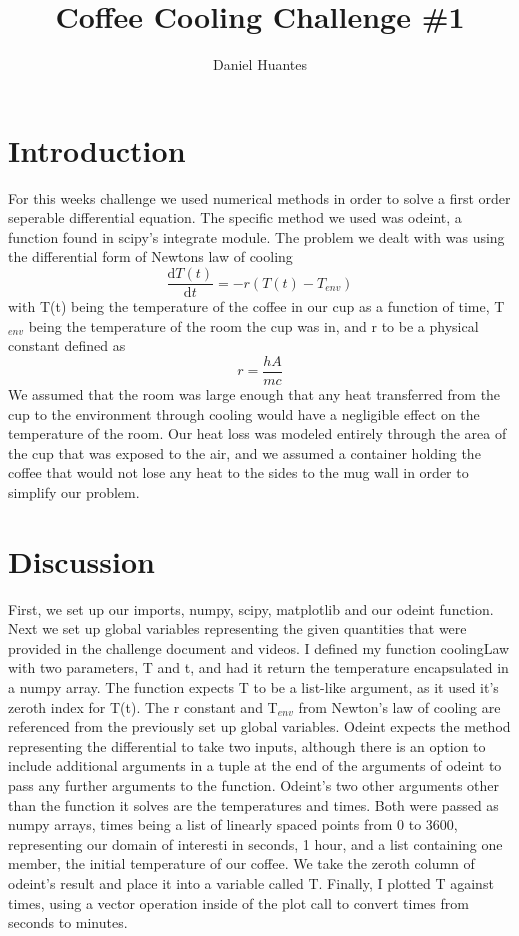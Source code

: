 \documentclass[12pt]{article}
\begin{document}
\title{Coffee Cooling Challenge \#1}
\author{Daniel Huantes}
\twocolumn
\maketitle
\section{Introduction}
For this weeks challenge we used numerical methods in order to solve a first order seperable differential equation. The specific method we used was odeint, a function found in scipy's integrate module. The problem we dealt with was using the differential form of Newtons law of cooling 
\begin{equation}
\frac{\mathrm{d} T(t)}{\mathrm{d} t} = -r (T(t) - T_{env})
\end{equation}
with T(t) being the temperature of the coffee in our cup as a function of time, T$_{env}$ being the temperature of the room the cup was in, and r to be a physical constant defined as 
\begin{equation}
r = \frac{hA}{mc}
\end{equation}
We assumed that the room was large enough that any heat transferred from the cup to the environment through cooling would have a negligible effect on the temperature of the room. Our heat loss was modeled entirely through the area of the cup that was exposed to the air, and we assumed a container holding the coffee that would not lose any heat to the sides to the mug wall in order to simplify our problem.
\section{Discussion}
First, we set up our imports, numpy, scipy, matplotlib and our odeint function. Next we set up global variables representing the given quantities that were provided in the challenge document and videos. I defined my function coolingLaw with two parameters, T and t, and had it return the temperature encapsulated in a numpy array. The function expects T to be a list-like argument, as it used it's zeroth index for T(t). The r constant and T$_{env}$ from Newton's law of cooling are referenced from the previously set up global variables. Odeint expects the method representing the differential to take two inputs, although there is an option to include additional arguments in a tuple at the end of the arguments of odeint to pass any further arguments to the function. Odeint's two other arguments other than the function it solves are the temperatures and times. Both were passed as numpy arrays, times being a list of linearly spaced points from 0 to 3600, representing our domain of interesti in seconds, 1 hour, and a list containing one member, the initial temperature of our coffee. We take the zeroth column of odeint's result and place it into a variable called T. Finally, I plotted T against times, using a vector operation inside of the plot call to convert times from seconds to minutes.
\end{document}
